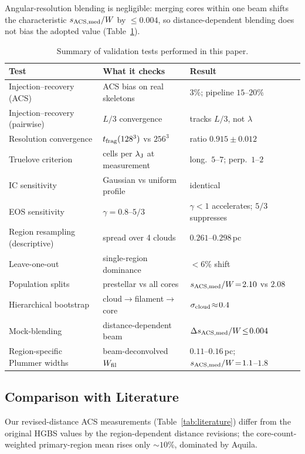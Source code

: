 \documentclass[usenatbib,twoside,twocolumn]{mnras}
\begin{document}
Angular-resolution blending is negligible: merging cores within one beam shifts the characteristic $s_{\rm ACS,med}/W$ by $\le0.004$, so distance-dependent blending does not bias the adopted value (Table~\ref{tab:validation_summary}).

\begin{table}
\caption{Summary of validation tests performed in this paper.}
\label{tab:validation_summary}
\footnotesize
\setlength{\tabcolsep}{3pt}
\begin{tabular}{p{2.3cm}p{2.9cm}p{2.0cm}}
\toprule
Test & What it checks & Result \\
\midrule
Injection--recovery (ACS) & ACS bias on real skeletons & $3\%$; pipeline $15$--$20\%$ \\
Injection--recovery (pairwise) & $L/3$ convergence & tracks $L/3$, not $\lambda$ \\
Resolution convergence & $t_{\rm frag}(128^3)$ vs $256^3$ & ratio $0.915\pm0.012$ \\
Truelove criterion & cells per $\lambda_{\rm J}$ at measurement & long.\ $5$--$7$; perp.\ $1$--$2$ \\
IC sensitivity & Gaussian vs uniform profile & identical \\
EOS sensitivity & $\gamma=0.8$--$5/3$ & $\gamma<1$ accelerates; $5/3$ suppresses \\
Region resampling (descriptive) & spread over 4 clouds & $0.261$--$0.298$\,pc \\
Leave-one-out & single-region dominance & $<6\%$ shift \\
Population splits & prestellar vs all cores & $s_{\rm ACS,med}/W\!=\!2.10$ vs $2.08$ \\
Hierarchical bootstrap & cloud$\to$filament$\to$core & $\sigma_{\rm cloud}\!\approx\!0.4$ \\
Mock-blending & distance-dependent beam & $\Delta s_{\rm ACS,med}/W\!\le\!0.004$ \\
Region-specific Plummer widths & beam-deconvolved $W_{\rm fil}$ & $0.11$--$0.16$\,pc; $s_{\rm ACS,med}/W\!=\!1.1$--$1.8$ \\
\bottomrule
\end{tabular}
\end{table}

\subsection{Comparison with Literature}

Our revised-distance ACS measurements (Table~\ref{tab:literature}) differ from the original HGBS values by the region-dependent distance revisions; the core-count-weighted primary-region mean rises only $\sim10\%$, dominated by Aquila.
\end{document}
